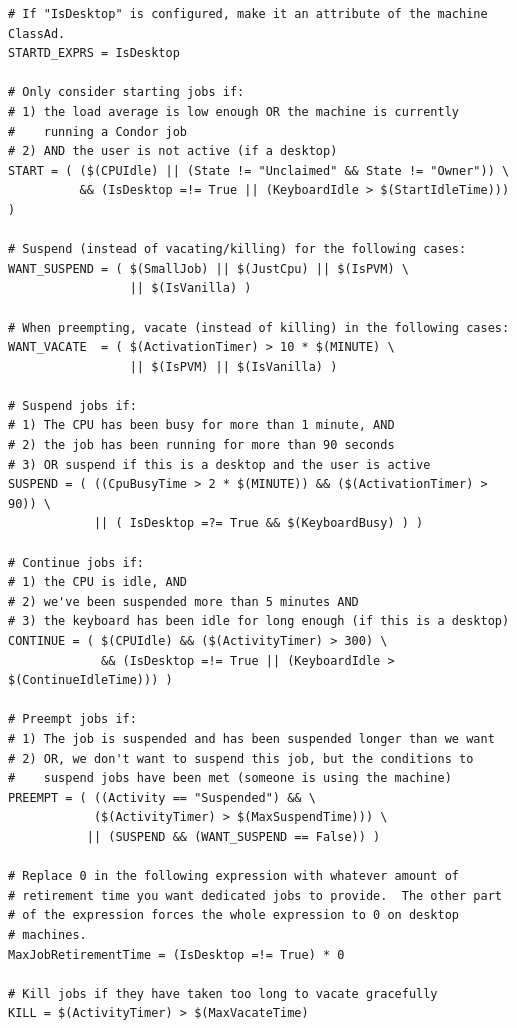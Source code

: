 \begin{verbatim}
# If "IsDesktop" is configured, make it an attribute of the machine ClassAd.
STARTD_EXPRS = IsDesktop

# Only consider starting jobs if:
# 1) the load average is low enough OR the machine is currently
#    running a Condor job
# 2) AND the user is not active (if a desktop)
START = ( ($(CPUIdle) || (State != "Unclaimed" && State != "Owner")) \
          && (IsDesktop =!= True || (KeyboardIdle > $(StartIdleTime))) )

# Suspend (instead of vacating/killing) for the following cases:
WANT_SUSPEND = ( $(SmallJob) || $(JustCpu) || $(IsPVM) \
                 || $(IsVanilla) )

# When preempting, vacate (instead of killing) in the following cases:
WANT_VACATE  = ( $(ActivationTimer) > 10 * $(MINUTE) \
                 || $(IsPVM) || $(IsVanilla) )

# Suspend jobs if:
# 1) The CPU has been busy for more than 1 minute, AND
# 2) the job has been running for more than 90 seconds
# 3) OR suspend if this is a desktop and the user is active
SUSPEND = ( ((CpuBusyTime > 2 * $(MINUTE)) && ($(ActivationTimer) > 90)) \
            || ( IsDesktop =?= True && $(KeyboardBusy) ) )

# Continue jobs if:
# 1) the CPU is idle, AND 
# 2) we've been suspended more than 5 minutes AND
# 3) the keyboard has been idle for long enough (if this is a desktop)
CONTINUE = ( $(CPUIdle) && ($(ActivityTimer) > 300) \
             && (IsDesktop =!= True || (KeyboardIdle > $(ContinueIdleTime))) )

# Preempt jobs if:
# 1) The job is suspended and has been suspended longer than we want
# 2) OR, we don't want to suspend this job, but the conditions to
#    suspend jobs have been met (someone is using the machine)
PREEMPT = ( ((Activity == "Suspended") && \
            ($(ActivityTimer) > $(MaxSuspendTime))) \
           || (SUSPEND && (WANT_SUSPEND == False)) )

# Replace 0 in the following expression with whatever amount of
# retirement time you want dedicated jobs to provide.  The other part
# of the expression forces the whole expression to 0 on desktop
# machines.
MaxJobRetirementTime = (IsDesktop =!= True) * 0

# Kill jobs if they have taken too long to vacate gracefully
KILL = $(ActivityTimer) > $(MaxVacateTime) 

\end{verbatim}

